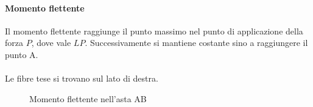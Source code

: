 \documentclass[main.tex]{subfiles}
\begin{document}
\paragraph{Momento flettente}
Il momento flettente raggiunge il punto massimo nel punto di applicazione della forza $P$, dove vale $LP$. Successivamente si mantiene costante sino a raggiungere il punto A.
\\
\\
Le fibre tese si trovano sul lato di destra.

\begin{figure}[H]
\centering
\resizebox{.25\textwidth}{!}{}
\caption{Momento flettente nell'asta AB}
\end{figure}
\end{document}
